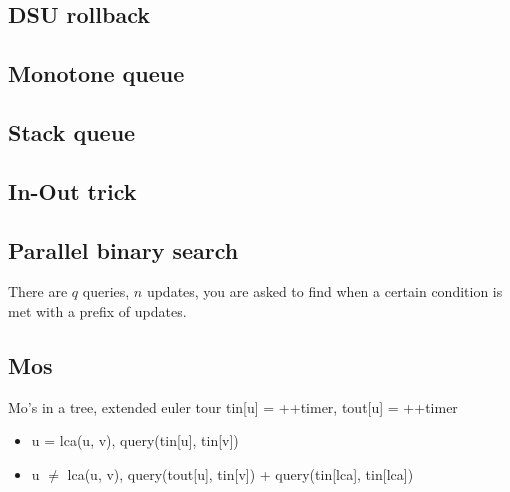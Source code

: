 
\subsection{DSU rollback }

\subsection{Monotone queue }


\subsection{Stack queue }


\subsection{In-Out trick }

\subsection{Parallel binary search }

There are $q$ queries, $n$ updates, you are asked to find when a certain condition is met with a prefix of updates.\\

\subsection{Mos }

Mo's in a tree, extended euler tour tin[u] = ++timer, tout[u] = ++timer 

\begin{itemize}
\item u = lca(u, v), query(tin[u], tin[v])
\item u $\neq$ lca(u, v), query(tout[u], tin[v]) + query(tin[lca], tin[lca]) 
\end{itemize}




